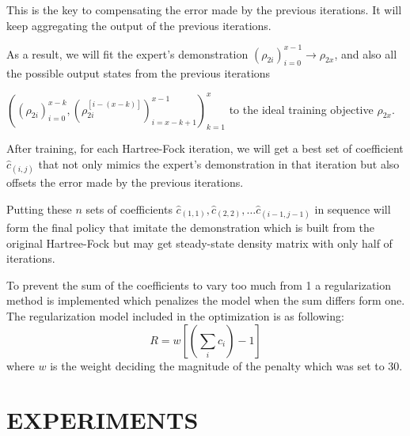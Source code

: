 \documentclass[twoside,11pt]{article}
\begin{document}
This is the key to compensating the error made by the previous iterations. It will keep aggregating the output of the previous iterations.







As a result, we will fit the expert's demonstration $(\rho_{2i})_{i=0}^{x-1} \rightarrow \rho_{2x}$, and also all the possible output states from the previous iterations 

$((\rho_{2i})_{i=0}^{x-k} ,(\rho_{2i}^{[i-(x-k)]})^{x-1}_{i=x-k+1})_{k=1}^{x}$  
to the ideal training objective $\rho_{2x}$.
%

After training, for each Hartree-Fock iteration, we will get a best set of coefficient $\hat{c}_{(i,j)}$ that not only mimics the expert's demonstration in that iteration but also offsets the error made by the previous iterations.

% 
Putting these $n$ sets of coefficients $\hat{c}_{(1,1)}, \hat{c}_{(2,2)}, \ldots  \hat{c}_{(i-1,j-1)}$ in sequence will form the final policy that imitate the demonstration which is built from  the original Hartree-Fock but may get steady-state density matrix with only half of iterations. 

To prevent the sum of the coefficients to vary too much from 1 a regularization method is implemented which penalizes the model when the sum differs form one. The regularization model included in the optimization is as following:
\[
R =  w [(\sum_i c_i) - 1]
\]
where $w$ is the weight deciding the magnitude of the penalty which was set to 30.


\section{EXPERIMENTS}
\end{document}
